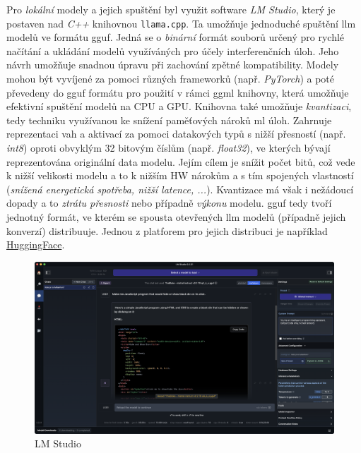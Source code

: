 \documentclass[czech, ma, kiv, he, iso690alph, pdf, viewonly]{fasthesis}
\begin{document}
            Pro \emph{lokální} modely a jejich spuštění byl využit software \textit{LM Studio}, který je postaven nad \textit{C++} knihovnou \verb|llama.cpp|. Ta umožňuje jednoduché spuštění \Gls{llm} modelů ve formátu \acrfull{gguf}. Jedná se o \textit{binární} formát souborů určený pro rychlé načítání a ukládání modelů využíváných pro účely interferenčních úloh. Jeho návrh umožňuje snadnou úpravu při zachování zpětné kompatibility. \cite{ggerganov_gguf} \cite{huggingface_gguf} Modely mohou být vyvíjené za pomoci různých frameworků (např. \textit{PyTorch}) a poté převedeny do \acrshort{gguf} formátu pro použití v rámci \acrshort{ggml} knihovny, která umožňuje efektivní spuštění modelů na CPU a GPU. Knihovna také umožňuje \emph{kvantizaci}, tedy techniku využívanou ke snížení paměťových nároků \acrshort{ml} úloh. Zahrnuje reprezentaci vah a aktivací za pomoci datakových typů s nižší přesností (např. \textit{int8}) oproti obvyklým 32 bitovým číslům (např. \textit{float32}), ve kterých bývají reprezentována originální data modelu. Jejím cílem je snížit počet bitů, což vede k nižší velikosti modelu a to k nižším HW nárokům a s tím spojených vlastností (\textit{snížená energetická spotřeba, nižší latence, ...}). Kvantizace má však i nežádoucí dopady a to \textit{ztrátu přesnosti} nebo případně \textit{výkonu} modelu. \cite{huggingface_quantization} \Acrshort{gguf} tedy tvoří jednotný formát, ve kterém se spousta otevřených \Gls{llm} modelů (případně jejich konverzí) distribuuje. Jednou z platforem pro jejich distribuci je například \href{https://huggingface.co}{HuggingFace}.

            \begin{figure}
                \includegraphics[width=\textwidth]{pic/lm_studio.png}
                \centering
                \caption{LM Studio}
                \label{fig:lm_studio}
            \end{figure}
\end{document}

